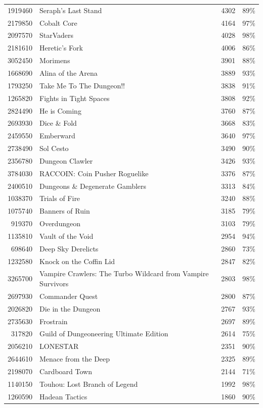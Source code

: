 \documentclass[11pt,letterpaper]{report}
\begin{document}
\begin{center}
\begin{tabular}{rlrl}
1919460 & Seraph's Last Stand & 4302 & 89\%\\
2179850 & Cobalt Core & 4164 & 97\%\\
2097570 & StarVaders & 4028 & 98\%\\
2181610 & Heretic's Fork & 4006 & 86\%\\
3052450 & Morimens & 3901 & 88\%\\
1668690 & Alina of the Arena & 3889 & 93\%\\
1793250 & Take Me To The Dungeon!! & 3838 & 91\%\\
1265820 & Fights in Tight Spaces & 3808 & 92\%\\
2824490 & He is Coming & 3760 & 87\%\\
2693930 & Dice \& Fold & 3668 & 83\%\\
2459550 & Emberward & 3640 & 97\%\\
2738490 & Sol Cesto & 3490 & 90\%\\
2356780 & Dungeon Clawler & 3426 & 93\%\\
3784030 & RACCOIN: Coin Pusher Roguelike & 3376 & 87\%\\
2400510 & Dungeons \& Degenerate Gamblers & 3313 & 84\%\\
1038370 & Trials of Fire & 3240 & 88\%\\
1075740 & Banners of Ruin & 3185 & 79\%\\
919370 & Overdungeon & 3103 & 79\%\\
1135810 & Vault of the Void & 2954 & 94\%\\
698640 & Deep Sky Derelicts & 2860 & 73\%\\
1232580 & Knock on the Coffin Lid & 2847 & 82\%\\
3265700 & Vampire Crawlers: The Turbo Wildcard from Vampire Survivors & 2803 & 98\%\\
2697930 & Commander Quest & 2800 & 87\%\\
2026820 & Die in the Dungeon & 2767 & 93\%\\
2735630 & Frostrain & 2697 & 89\%\\
317820 & Guild of Dungeoneering Ultimate Edition & 2614 & 75\%\\
2056210 & LONESTAR & 2351 & 90\%\\
2644610 & Menace from the Deep & 2325 & 89\%\\
2198070 & Cardboard Town & 2144 & 71\%\\
1140150 & Touhou: Lost Branch of Legend & 1992 & 98\%\\
1260590 & Hadean Tactics & 1860 & 90\%\\

\end{tabular}
\end{center}
\end{document}
